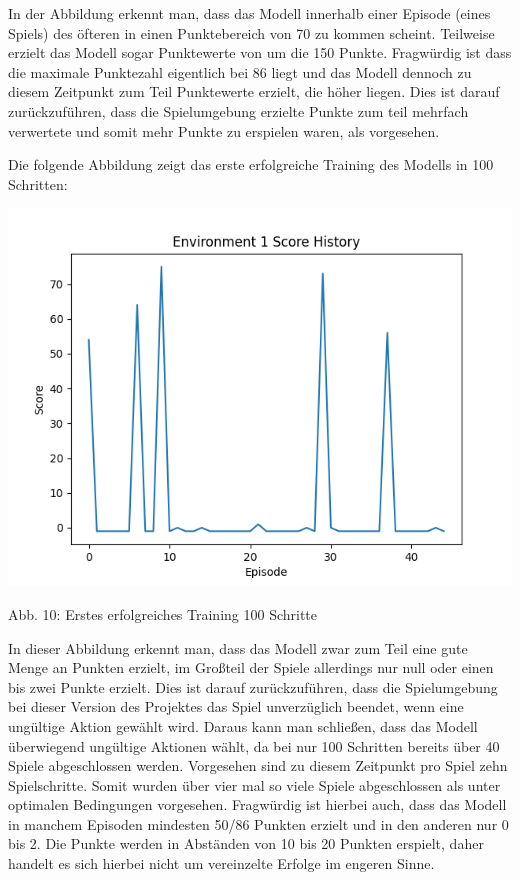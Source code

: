 In der Abbildung erkennt man, dass das Modell innerhalb einer Episode (eines Spiels) des öfteren in einen Punktebereich von 70 zu kommen scheint. Teilweise erzielt das Modell sogar Punktewerte von um die 150 Punkte. Fragwürdig ist dass die maximale Punktezahl eigentlich bei 86 liegt und das Modell dennoch zu diesem Zeitpunkt zum Teil Punktewerte erzielt, die höher liegen. Dies ist darauf zurückzuführen, dass die Spielumgebung erzielte Punkte zum teil mehrfach verwertete und somit mehr Punkte zu erspielen waren, als vorgesehen.

\begin{minipage}{\linewidth}
	Die folgende Abbildung zeigt das erste erfolgreiche Training des Modells in 100 Schritten:
	
	\vspace{0.5cm}
	\includegraphics[width=1\textwidth]{Bilder/firstpropertraining100steps}
	
	Abb. 10: Erstes erfolgreiches Training 100 Schritte\\
\end{minipage}

In dieser Abbildung erkennt man, dass das Modell zwar zum Teil eine gute Menge an Punkten erzielt, im Großteil der Spiele allerdings nur null oder einen bis zwei Punkte erzielt. Dies ist darauf zurückzuführen, dass die Spielumgebung bei dieser Version des Projektes das Spiel unverzüglich beendet, wenn eine ungültige Aktion gewählt wird. Daraus kann man schließen, dass das Modell überwiegend ungültige Aktionen wählt, da bei nur 100 Schritten bereits über 40 Spiele abgeschlossen werden. Vorgesehen sind zu diesem Zeitpunkt pro Spiel zehn Spielschritte. Somit wurden über vier mal so viele Spiele abgeschlossen als unter optimalen Bedingungen vorgesehen. Fragwürdig ist hierbei auch, dass das Modell in manchem Episoden mindesten 50/86 Punkten erzielt und in den anderen nur 0 bis 2. Die Punkte werden in Abständen von 10 bis 20 Punkten erspielt, daher handelt es sich hierbei nicht um vereinzelte Erfolge im engeren Sinne.
